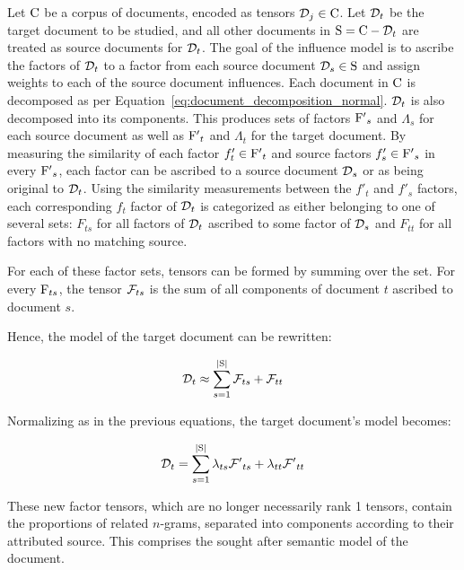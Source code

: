 \documentclass[../dissertation.tex]{subfiles}
\begin{document}
Let $\mathrm{C}$ be a corpus of documents, encoded as tensors
$\mathcal{D}_j \in \mathrm{C}$.  Let $\mathcal{D}_t$ be the target document to
be studied, and all other documents in $\mathrm{S}=\mathrm{C} - \mathcal{D}_t$
are treated as source documents for $\mathcal{D}_t$.  The goal of the
influence model is to ascribe the factors of $\mathcal{D}_t$ to a factor
from each source document $\mathcal{D}_s\in \mathrm{S}$ and assign weights
to each of the source document influences. Each document in $\mathrm{C}$
is decomposed as per Equation~\ref{eq:document_decomposition_normal}.
$\mathcal{D}_t$ is also decomposed into its components.  This produces
sets of factors $\mathrm{F'}_s$ and $\Lambda_s$ for each source document
as well as $\mathrm{F'}_t$ and $\Lambda_t$ for the target document.  By
measuring the similarity of each factor $f'_{t}\in\mathrm{F'}_{t}$ and
source factors $f'_{s}\in \mathrm{F'}_s$ in every $\mathrm{F'}_s$, each
factor can be ascribed to a source document $\mathcal{D}_s$ or as being
original to $\mathcal{D}_t$.  Using the similarity measurements between
the $f'_t$ and $f'_s$ factors, each corresponding $f_t$ factor of
$\mathcal{D}_t$ is categorized as either belonging to one of several
sets: $F_{ts}$ for all factors of $\mathcal{D}_t$ ascribed to some factor
of $\mathcal{D}_s$ and $F_{tt}$ for all factors with no matching source.

For each of these factor sets, tensors can be formed by summing over
the set.  For every $\mathrm{F}_{ts}$, the tensor $\mathcal{F}_{ts}$ is the
sum of all components of document $t$ ascribed to document $s$.  

Hence, the model of the target document can be rewritten:

\begin{equation} \label{eq:influence_factors}
  \mathcal{D}_t \approx \sum_{s=1}^{|\mathrm{S}|} \mathcal{F}_{ts} + \mathcal{F}_{tt}
\end{equation}

Normalizing as in the previous equations, the target
document's model becomes:

\begin{equation} \label{eq:influence_factors_normalized}
  \mathcal{D}_t = \sum_{s=1}^{|\mathrm{S}|} \lambda_{ts} \mathcal{F'}_{ts} +
  \lambda_{tt} \mathcal{F'}_{tt}
\end{equation}

These new factor tensors, which are no longer necessarily rank 1
tensors, contain the proportions of related $n$-grams, separated into
components according to their attributed source.  This comprises the
sought after semantic model of the document.  
\end{document}

